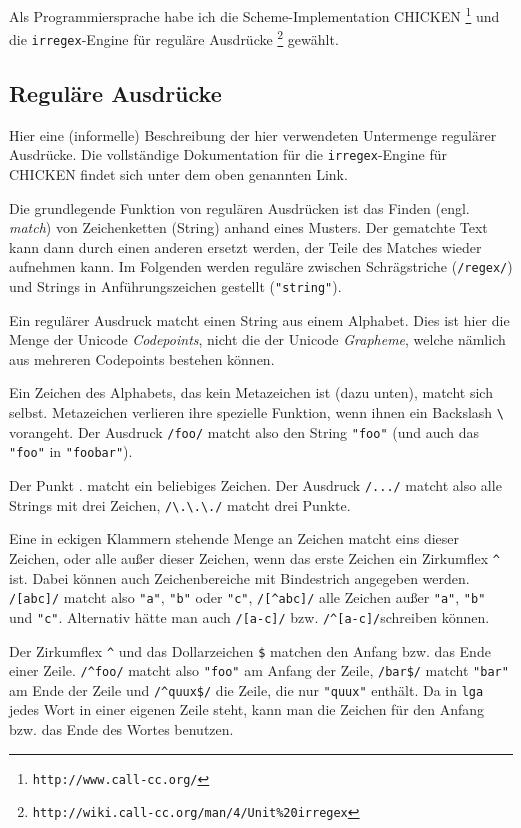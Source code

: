 \documentclass[12pt,a4paper,normalheadings]{scrartcl}
\def\bel#1{\mbox{\textit{#1}}}
\def\tt#1{\texttt{#1}}
\def\rx#1{\texttt{/#1/}}
\def\str#1{\texttt{"#1"}}
\begin{document}
Als Programmiersprache habe ich die Scheme-Implementation CHICKEN
\footnote{\tt{http://www.call-cc.org/}}
und die \tt{irregex}-Engine für reguläre Ausdrücke
\footnote{\tt{http://wiki.call-cc.org/man/4/Unit\%20irregex}}
gewählt.

\subsection{Reguläre Ausdrücke}

Hier eine (informelle)
Beschreibung der hier verwendeten Untermenge regulärer Ausdrücke.
Die vollständige Dokumentation für die \tt{irregex}-Engine für
CHICKEN findet sich unter dem oben genannten Link.

Die grundlegende Funktion von regulären Ausdrücken ist das
Finden (engl. \bel{match}) von Zeichenketten (String) anhand eines Musters.
Der gematchte Text kann dann durch einen anderen ersetzt werden,
der Teile des Matches wieder aufnehmen kann.
Im Folgenden werden reguläre zwischen Schrägstriche (\rx{regex})
und Strings in Anführungszeichen gestellt (\str{string}).

Ein regulärer Ausdruck matcht einen String aus einem Alphabet.
Dies ist hier die Menge der Unicode \emph{Codepoints}, nicht die
der Unicode \emph{Grapheme},
welche nämlich aus mehreren Codepoints bestehen können.

Ein Zeichen des Alphabets, das kein Metazeichen ist (dazu unten),
matcht sich selbst.
Metazeichen verlieren ihre spezielle Funktion,
wenn ihnen ein Backslash \tt{\textbackslash} vorangeht.
Der Ausdruck \rx{foo} matcht also den String \str{foo}
(und auch das \str{foo} in \str{foobar}).

Der Punkt . matcht ein beliebiges Zeichen.
Der Ausdruck \rx{...} matcht also alle Strings mit drei Zeichen,
\rx{\textbackslash.\textbackslash.\textbackslash.} matcht drei Punkte.

Eine in eckigen Klammern stehende Menge an Zeichen matcht eins dieser Zeichen,
oder alle außer dieser Zeichen,
wenn das erste Zeichen ein Zirkumflex \tt{\textasciicircum} ist.
Dabei können auch Zeichenbereiche mit Bindestrich angegeben werden.
\rx{[abc]} matcht also \str{a}, \str{b} oder \str{c},
\rx{[\textasciicircum{}abc]} alle Zeichen außer \str{a}, \str{b} und \str{c}.
Alternativ hätte man auch \rx{[a-c]} bzw. \rx{\textasciicircum[a-c]}schreiben können.

Der Zirkumflex \tt{\textasciicircum} und das Dollarzeichen \tt{\$}
matchen den Anfang bzw. das Ende einer Zeile.
\rx{\textasciicircum{}foo} matcht also \str{foo} am Anfang der Zeile,
\rx{bar\$} matcht \str{bar} am Ende der Zeile
und \rx{\textasciicircum{}quux\$} die Zeile, die nur \str{quux} enthält.
Da in \tt{lga} jedes Wort in einer eigenen Zeile steht,
kann man die Zeichen für den Anfang bzw. das Ende des Wortes benutzen.
\end{document}
